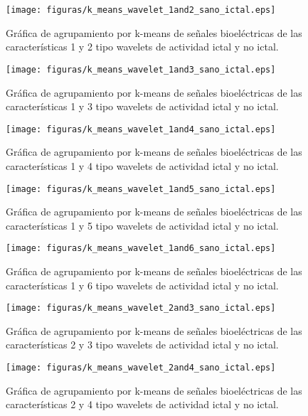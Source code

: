 \begin{figure}[H]
    \centering
    \texttt{[image: figuras/k\_means\_wavelet\_1and2\_sano\_ictal.eps]}
    \caption{Gráfica de agrupamiento por k-means de señales bioeléctricas de las características 1 y 2 tipo wavelets de actividad ictal y no ictal.}
    \label{fig: k_means_wave_1_2}
\end{figure}
\begin{figure}[H]
    \centering
    \texttt{[image: figuras/k\_means\_wavelet\_1and3\_sano\_ictal.eps]}
    \caption{Gráfica de agrupamiento por k-means de señales bioeléctricas de las características 1 y 3 tipo wavelets de actividad ictal y no ictal.}
    \label{fig: k_means_wave_1_3}
\end{figure}
\begin{figure}[H]
    \centering
    \texttt{[image: figuras/k\_means\_wavelet\_1and4\_sano\_ictal.eps]}
    \caption{Gráfica de agrupamiento por k-means de señales bioeléctricas de las características 1 y 4  tipo wavelets de actividad ictal y no ictal.}
    \label{fig: k_means_wave_1_4}
\end{figure}
\begin{figure}[H]
    \centering
    \texttt{[image: figuras/k\_means\_wavelet\_1and5\_sano\_ictal.eps]}
    \caption{Gráfica de agrupamiento por k-means de señales bioeléctricas de las características 1 y 5 tipo wavelets de actividad ictal y no ictal.}
    \label{fig: k_means_wave_1_5}
\end{figure}
\begin{figure}[H]
    \centering
    \texttt{[image: figuras/k\_means\_wavelet\_1and6\_sano\_ictal.eps]}
    \caption{Gráfica de agrupamiento por k-means de señales bioeléctricas de las características 1 y 6 tipo wavelets de actividad ictal y no ictal.}
    \label{fig: k_means_wave_1_6}
\end{figure}
\begin{figure}[H]
    \centering
    \texttt{[image: figuras/k\_means\_wavelet\_2and3\_sano\_ictal.eps]}
    \caption{Gráfica de agrupamiento por k-means de señales bioeléctricas de las características 2 y 3 tipo wavelets de actividad ictal y no ictal.}
    \label{fig: k_means_wave_2_3}
\end{figure}
\begin{figure}[H]
    \centering
    \texttt{[image: figuras/k\_means\_wavelet\_2and4\_sano\_ictal.eps]}
    \caption{Gráfica de agrupamiento por k-means de señales bioeléctricas de las características 2 y 4 tipo wavelets de actividad ictal y no ictal.}
    \label{fig: k_means_wave_2_4}
\end{figure}
